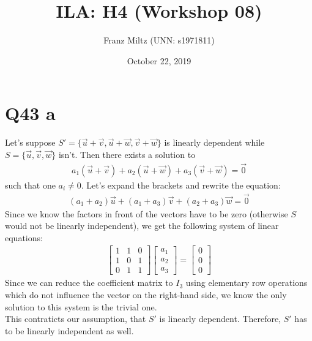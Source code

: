 \documentclass{article}
\title{ILA: H4 (Workshop 08)}
\author{Franz Miltz (UNN: s1971811)}
\date{October 22, 2019}
\begin{document}
\maketitle
\section*{Q43 a}
Let's suppose $S'=\{\vec u+\vec v, \vec u+\vec w, \vec v+\vec w\}$ is linearly dependent 
while $S=\{\vec u, \vec v, \vec w\}$ isn't. Then there exists a solution to
\begin{align}
    a_1(\vec u+\vec v) + a_2(\vec u + \vec w) + a_3(\vec v + \vec w) = \vec 0
\end{align}
such that one $a_i\not=0$. Let's expand the brackets and rewrite the equation:
\begin{align}
    (a_1+a_2)\vec u + (a_1+a_3) \vec v + (a_2 + a_3) \vec w = \vec 0
\end{align}
Since we know the factors in front of the vectors have to be zero (otherwise $S$ would not be linearly independent), we get the following system of linear equations:
\begin{align}
    \begin{bmatrix}
        1 &1 &0\\
        1 &0 &1\\
        0 &1 &1
    \end{bmatrix}
    \begin{bmatrix}
        a_1\\a_2\\a_3
    \end{bmatrix}
    = \begin{bmatrix}
        0 \\ 0 \\ 0
    \end{bmatrix}
\end{align}
Since we can reduce the coefficient matrix to $I_3$ using elementary row operations which do not influence the vector on the right-hand side, we know the only solution to this system is the trivial one.\\
This contraticts our assumption, that $S'$ is linearly dependent. Therefore, $S'$ has to be linearly independent as well.
\end{document}
